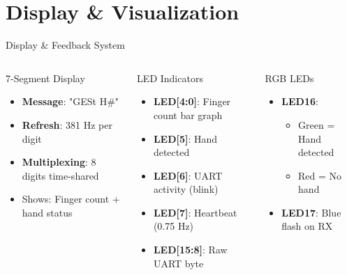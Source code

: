 \documentclass[aspectratio=169]{beamer}
\begin{document}
\section{Display \& Visualization}

\begin{frame}{Display \& Feedback System}
\begin{columns}
\begin{block}{7-Segment Display}
\begin{itemize}
    \item \textbf{Message}: "GESt H\#"
    \item \textbf{Refresh}: 381 Hz per digit
    \item \textbf{Multiplexing}: 8 digits time-shared
    \item Shows: Finger count + hand status
\end{itemize}
\end{block}

\begin{block}{LED Indicators}
\begin{itemize}
    \item \textbf{LED[4:0]}: Finger count bar graph
    \item \textbf{LED[5]}: Hand detected
    \item \textbf{LED[6]}: UART activity (blink)
    \item \textbf{LED[7]}: Heartbeat (0.75 Hz)
    \item \textbf{LED[15:8]}: Raw UART byte
\end{itemize}
\end{block}

\begin{block}{RGB LEDs}
\begin{itemize}
    \item \textbf{LED16}:
        \begin{itemize}
            \item Green = Hand detected
            \item Red = No hand
        \end{itemize}
    \item \textbf{LED17}: Blue flash on RX
\end{itemize}
\end{block}

\vspace{0.3cm}


\end{columns}
\end{frame}
\end{document}
